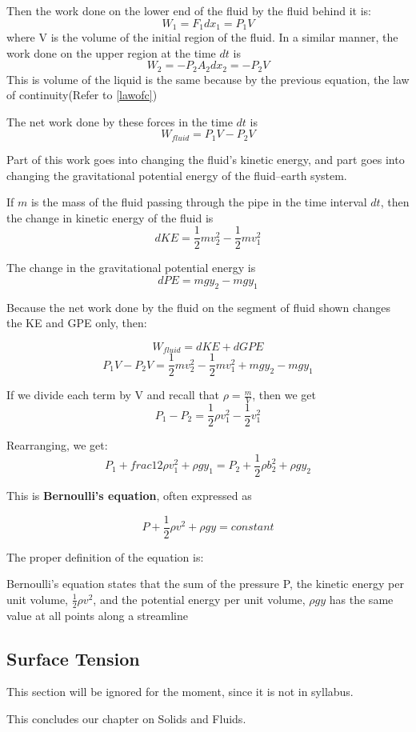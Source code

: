 Then the work done on the lower end of the fluid by the fluid behind it is:
$$W_1 = F_1d x_1 =P_1V$$
where V is the volume of the initial region of the fluid. In a similar manner, the work done on the upper region at the time $d t$ is
$$W_2 = -P_2A_2d x_2 = -P_2V$$
This is volume of the liquid is the same because by the previous equation, the law of continuity(Refer to \ref{lawofc})

The net work done by these forces in the time $d t$ is
$$W_{fluid} = P_1V - P_2V$$

Part of this work goes into changing the fluid's kinetic energy, and part goes into changing the gravitational potential energy of the fluid--earth system.

If $m$ is the mass of the fluid passing through the pipe in the time interval $d t$, then the change in kinetic energy of the fluid is
$$d KE = \frac{1}{2}mv_2^2 - \frac{1}{2}mv_1^2$$

The change in the gravitational potential energy is
$$d PE = mgy_2 - mgy_1$$

Because the net work done by the fluid on the segment of fluid shown changes the KE and GPE only, then:

$$W_{fluid} = d KE +d GPE$$
$$P_1V-P_2V = \frac{1}{2}mv_2^2-\frac{1}{2}mv_1^2+mgy_2 - mgy_1$$

If we divide each term by V and recall that $\rho=\frac{m}{V}$, then we get
$$P_1-P_2 = \frac{1}{2}\rho v_1^2 -\frac{1}{2}v_1^2$$

Rearranging, we get:
$$P_1 + frac{1}{2}\rho v_1^2 + \rho g y_1= P_2 + \frac{1}{2}\rho b_2^2 +\rho g y_2$$

This is \textbf{Bernoulli's equation}, often expressed as
\begin{form}
$$P+\frac{1}{2}\rho v^2+\rho gy = constant$$
\end{form}

The proper definition of the equation is:
\begin{defi}
Bernoulli's equation states that the sum of the pressure P, the kinetic energy per unit volume, $\frac{1}{2}\rho v^2$, and the potential energy per unit volume, $\rho gy$ has the same value at all points along a streamline
\end{defi}

\subsection{Surface Tension}
This section will be ignored for the moment, since it is not in syllabus.

This concludes our chapter on Solids and Fluids.